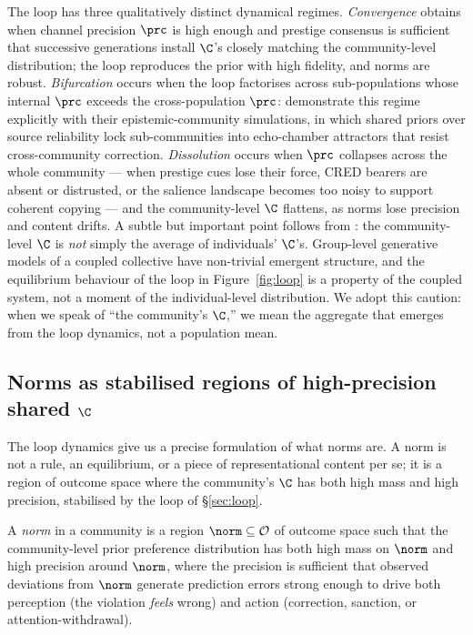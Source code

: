 The loop has three qualitatively distinct dynamical regimes. \emph{Convergence}
obtains when channel precision $\prc$ is high enough and prestige consensus
is sufficient that successive generations install $\C$'s closely matching
the community-level distribution; the loop reproduces the prior with high
fidelity, and norms are robust. \emph{Bifurcation} occurs when the loop
factorises across sub-populations whose internal $\prc$ exceeds the
cross-population $\prc$: \citet{albarracin2022EpistemicCommunities} demonstrate
this regime explicitly with their epistemic-community simulations, in which
shared priors over source reliability lock sub-communities into echo-chamber
attractors that resist cross-community correction. \emph{Dissolution} occurs
when $\prc$ collapses across the whole community --- when prestige cues lose
their force, CRED bearers are absent or distrusted, or the salience
landscape becomes too noisy to support coherent copying --- and the
community-level $\C$ flattens, as norms lose precision and content drifts.
A subtle but important point follows from \citet{heins2025AsOneAndMany}: the
community-level $\C$ is \emph{not} simply the average of individuals' $\C$'s.
Group-level generative models of a coupled collective have non-trivial
emergent structure, and the equilibrium behaviour of the loop in
Figure~\ref{fig:loop} is a property of the coupled system, not a moment of
the individual-level distribution. We adopt this caution: when we speak of
``the community's $\C$,'' we mean the aggregate that emerges from the loop
dynamics, not a population mean.

\subsection{Norms as stabilised regions of high-precision shared $\C$}
\label{sec:norms}

The loop dynamics give us a precise formulation of what norms are. A norm is
not a rule, an equilibrium, or a piece of representational content per se;
it is a region of outcome space where the community's $\C$ has both high
mass and high precision, stabilised by the loop of
\S\ref{sec:loop}.

\begin{definition}[Norm]
\label{def:norm}
A \emph{norm} in a community is a region $\norm \subseteq \mathcal{O}$ of
outcome space such that the community-level prior preference distribution
has both high mass on $\norm$ and high precision around $\norm$, where the
precision is sufficient that observed deviations from $\norm$ generate
prediction errors strong enough to drive both perception (the violation
\emph{feels} wrong) and action (correction, sanction, or attention-withdrawal).
\end{definition}

